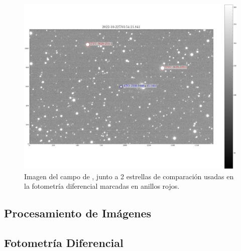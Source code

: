 \begin{figure}[!ht]
	\centering
	\includegraphics[scale=0.4]{Observaciones/Secciones/Figures/10-22 Sample Image.png}
	\caption{Imagen del campo de \atoObjId, junto a 2 estrellas de comparación usadas en la fotometría diferencial marcadas en anillos rojos.}
	\label{ccdImageField}
\end{figure}

\subsection{Procesamiento de Imágenes}


\subsection{Fotometría Diferencial}